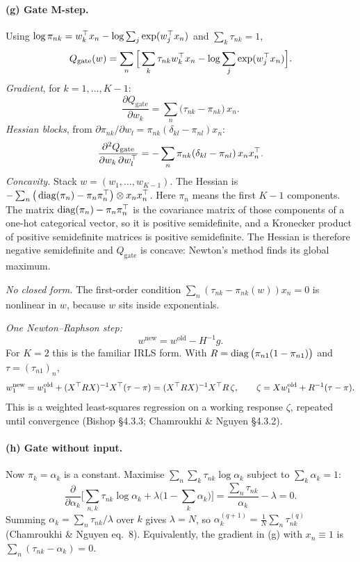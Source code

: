 \paragraph{(g) Gate M-step.} Using $\log\pi_{nk}=w_k^{\top} x_n-\log\sum_j\exp(w_j^{\top} x_n)$ and $\sum_k\tau_{nk}=1$,
\begin{equation}
Q_{\text{gate}}(w)=\sum_n\Big[\sum_k\tau_{nk}w_k^{\top} x_n-\log\sum_j\exp(w_j^{\top} x_n)\Big].
\end{equation}
\emph{Gradient}, for $k=1,\dots,K-1$:
\begin{equation}
\frac{\partial Q_{\text{gate}}}{\partial w_k}=\sum_n\big(\tau_{nk}-\pi_{nk}\big)\,x_n.
\end{equation}
\emph{Hessian blocks}, from $\partial\pi_{nk}/\partial w_l=\pi_{nk}(\delta_{kl}-\pi_{nl})x_n$:
\begin{equation}
\frac{\partial^2Q_{\text{gate}}}{\partial w_k\,\partial w_l^{\top}}=-\sum_n\pi_{nk}(\delta_{kl}-\pi_{nl})\,x_nx_n^{\top}.
\end{equation}
\emph{Concavity.} Stack $w=(w_1,\dots,w_{K-1})$. The Hessian is $-\sum_n\big(\operatorname{diag}(\pi_n)-\pi_n\pi_n^{\top}\big)\otimes x_nx_n^{\top}$. Here $\pi_n$ means the first $K-1$ components. The matrix $\operatorname{diag}(\pi_n)-\pi_n\pi_n^{\top}$ is the covariance matrix of those components of a one-hot categorical vector, so it is positive semidefinite, and a Kronecker product of positive semidefinite matrices is positive semidefinite. The Hessian is therefore negative semidefinite and $Q_{\text{gate}}$ is concave: Newton's method finds its global maximum.

\emph{No closed form.} The first-order condition $\sum_n(\tau_{nk}-\pi_{nk}(w))x_n=0$ is nonlinear in $w$, because $w$ sits inside exponentials.

\emph{One Newton--Raphson step:}
\begin{equation}
w^{\text{new}}=w^{\text{old}}-H^{-1}g.
\end{equation}
For $K=2$ this is the familiar IRLS form. With $R=\operatorname{diag}\big(\pi_{n1}(1-\pi_{n1})\big)$ and $\tau=(\tau_{n1})_n$,
\begin{equation}
w_1^{\text{new}}=w_1^{\text{old}}+(X^{\top} RX)^{-1}X^{\top}(\tau-\pi)=(X^{\top} RX)^{-1}X^{\top} R\,\zeta,\qquad\zeta=Xw_1^{\text{old}}+R^{-1}(\tau-\pi).
\end{equation}
This is a weighted least-squares regression on a working response $\zeta$, repeated until convergence (Bishop \S4.3.3; Chamroukhi \& Nguyen \S4.3.2).

\paragraph{(h) Gate without input.} Now $\pi_k=\alpha_k$ is a constant. Maximise $\sum_n\sum_k\tau_{nk}\log\alpha_k$ subject to $\sum_k\alpha_k=1$:
\begin{equation}
\frac{\partial}{\partial\alpha_k}\Big[\sum_{n,k}\tau_{nk}\log\alpha_k+\lambda\Big(1-\sum_k\alpha_k\Big)\Big]=\frac{\sum_n\tau_{nk}}{\alpha_k}-\lambda=0.
\end{equation}
Summing $\alpha_k=\sum_n\tau_{nk}/\lambda$ over $k$ gives $\lambda=N$, so $\alpha_k^{(q+1)}=\frac1N\sum_n\tau_{nk}^{(q)}$ (Chamroukhi \& Nguyen eq.~8). Equivalently, the gradient in (g) with $x_n\equiv1$ is $\sum_n(\tau_{nk}-\alpha_k)=0$.

